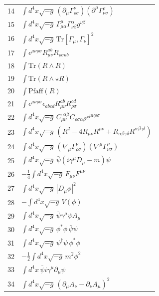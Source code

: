 \documentclass[12pt,a4paper]{article}
\begin{document}
\begin{longtable}{r p{}}
	14 & \(\displaystyle \int d^4x\sqrt{-g}\,(\partial_\mu\Gamma^{\nu}_{\rho\sigma})(\partial^\mu\Gamma^{\rho}_{\nu\sigma})\) \\
	15 & \(\displaystyle \int d^4x\sqrt{-g}\,\Gamma^{\mu}_{\mu\alpha}\Gamma^{\alpha}_{\nu\beta}g^{\nu\beta}\) \\
	16 & \(\displaystyle \int d^4x\sqrt{-g}\,\mathrm{Tr}[\Gamma_\mu,\Gamma_\nu]^2\) \\
	17 & \(\displaystyle \int \epsilon^{\mu\nu\rho\sigma}R_{\mu\nu}^{ab}R_{\rho\sigma ab}\) \\
	18 & \(\displaystyle \int \mathrm{Tr}(R\wedge R)\) \\
	19 & \(\displaystyle \int \mathrm{Tr}(R\wedge\star R)\) \\
	20 & \(\displaystyle \int \mathrm{Pfaff}(R)\) \\
	21 & \(\displaystyle \int \epsilon^{\mu\nu\rho\sigma}\epsilon_{abcd}R_{\mu\nu}^{ab}R_{\rho\sigma}^{cd}\) \\
	22 & \(\displaystyle \int d^4x\sqrt{-g}\,C_{\mu\nu}^{\ \ \alpha\beta}C_{\rho\sigma\alpha\beta}\epsilon^{\mu\nu\rho\sigma}\) \\
	23 & \(\displaystyle \int d^4x\sqrt{-g}\,(R^2 - 4R_{\mu\nu}R^{\mu\nu} + R_{\alpha\beta\gamma\delta}R^{\alpha\beta\gamma\delta})\) \\
	24 & \(\displaystyle \int d^4x\sqrt{-g}\,(\nabla_\mu\Gamma^{\nu}_{\rho\sigma})(\nabla^\mu\Gamma^{\rho}_{\nu\sigma})\) \\
	25 & \(\displaystyle \int d^4x\sqrt{-g}\,\bar\psi(i\gamma^\mu D_\mu - m)\psi\) \\
	26 & \(\displaystyle -\frac14\int d^4x\sqrt{-g}\,F_{\mu\nu}F^{\mu\nu}\) \\
	27 & \(\displaystyle \int d^4x\sqrt{-g}\,|D_\mu\phi|^2\) \\
	28 & \(\displaystyle -\int d^4x\sqrt{-g}\,V(\phi)\) \\
	29 & \(\displaystyle \int d^4x\sqrt{-g}\,\bar\psi\gamma^\mu\psi A_\mu\) \\
	30 & \(\displaystyle \int d^4x\sqrt{-g}\,\phi^*\phi\,\bar\psi\psi\) \\
	31 & \(\displaystyle \int d^4x\sqrt{-g}\,\psi^\dagger\psi\,\phi^*\phi\) \\
	32 & \(\displaystyle -\frac12\int d^4x\sqrt{-g}\,m^2\phi^2\) \\
	33 & \(\displaystyle \int d^4x\,\bar\psi i\gamma^\mu\partial_\mu\psi\) \\
	34 & \(\displaystyle \int d^4x\sqrt{-g}\,(\partial_\mu A_\nu - \partial_\nu A_\mu)^2\) \\

\end{longtable}
\end{document}
